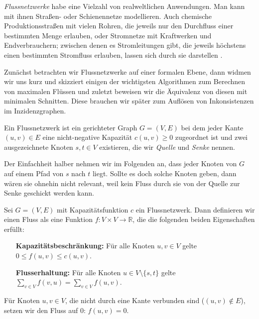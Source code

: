 \emph{Flussnetzwerke} habe eine Vielzahl von realweltlichen Anwendungen. Man kann mit ihnen Straßen- oder Schienennetze modellieren. Auch chemische Produktionsstraßen mit vielen Rohren, die jeweils nur den Durchfluss einer bestimmten Menge erlauben, oder Stromnetze mit Kraftwerken und Endverbrauchern; zwischen denen es Stromleitungen gibt, die jeweils höchstens einen bestimmten Stromfluss erlauben, lassen sich durch sie darstellen \cite[S.708]{clrs09}. 

Zunächst betrachten wir Flussnetzwerke auf einer formalen Ebene, dann widmen wir uns kurz und skizziert einigen der wichtigsten Algorithmen zum Berechnen von maximalen Flüssen und zuletzt beweisen wir die Äquivalenz von diesen mit minimalen Schnitten. Diese brauchen wir später zum Auflösen von Inkonsistenzen im Inzidenzgraphen.

\begin{definition}
	Ein Flussnetzwerk ist ein gerichteter Graph $G = (V,E)$ bei dem jeder Kante $(u,v) \in E$ eine nicht-negative Kapazität $c(u,v) \geq 0$ zugeordnet ist und zwei ausgezeichnete Knoten $s, t \in V$ existieren, die wir \emph{Quelle} und \emph{Senke} nennen.  
\end{definition}

Der Einfachheit halber nehmen wir im Folgenden an, dass jeder Knoten von $G$ auf einem Pfad von $s$ nach $t$ liegt. Sollte es doch solche Knoten geben, dann wären sie ohnehin nicht relevant, weil kein Fluss durch sie von der Quelle zur Senke geschickt werden kann.

\begin{definition}
	Sei $G = (V,E)$ mit Kapazitätsfunktion $c$ ein Flussnetzwerk. Dann definieren wir einen Fluss als eine Funktion $f: V \times V \rightarrow \mathbb{R}$, die die folgenden beiden Eigenschaften erfüllt:
	\begin{itemize}[leftmargin=12em]
		\item[\textbf{Kapazitätsbeschränkung:}] Für alle Knoten $u,v \in V$ gelte $0 \leq f(u,v) \leq c(u,v)$.
		\item[\textbf{Flusserhaltung:}] Für alle Knoten $u \in V\setminus\{s,t\}$ gelte \\ 
			$\sum_{v \in V}{f(v,u)} = \sum_{v \in V}{f(u,v)}$.
	\end{itemize} 
	Für Knoten $u,v\in V$, die nicht durch eine Kante verbunden sind ($(u,v)\notin E$), setzen wir den Fluss auf 0: $f(u,v) = 0$.
\end{definition}

